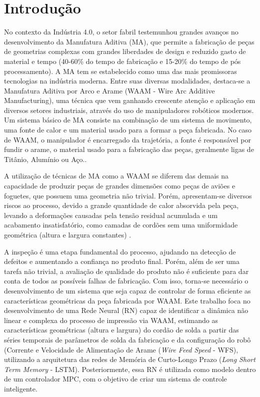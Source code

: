 \chapter{Introdução}
No contexto da Indústria 4.0, o setor fabril testemunhou grandes avanços no desenvolvimento da Manufatura Aditiva (MA), que permite a fabricação de peças de geometrias complexas com grandes liberdades de design e reduzido gasto de material e tempo (40-60\% do tempo de fabricação e 15-20\% do tempo de pós processamento). A MA tem se estabelecido como uma das mais promissoras tecnologias na indústria moderna. Entre suas diversas modalidades, destaca-se a Manufatura Aditiva por Arco e Arame (WAAM - Wire Arc Additive Manufacturing), uma técnica que vem ganhando crescente atenção e aplicação em diversos setores industriais, através do uso de manipuladores robóticos modernos. Um sistema básico de MA consiste na combinação de um sistema de movimento, uma fonte de calor e um material usado para a formar a peça fabricada. No caso de WAAM, o manipulador é encarregado da trajetória, a fonte é responsável por fundir o arame, o material usado para a fabricação das peças, geralmente ligas de Titânio, Alumínio ou Aço.\cite{williams2016wire, wu2018review}. 

A utilização de técnicas de MA como a WAAM se diferem das demais na capacidade de produzir peças de grandes dimensões como peças de aviões e foguetes, que possuem uma geometria não trivial. Porém, apresentam-se diversos riscos ao processo, devido a grande quantidade de calor absorvida pela peça, levando a deformações causadas pela tensão residual acumulada e um acabamento insatisfatório, como camadas de cordões sem uma uniformidade geométrica (altura e largura constantes) \cite{ding2015wire}.

A inspeção é uma etapa fundamental do processo, ajudando na detecção de defeitos e aumentando a confiança no produto final. Porém, além de ser uma tarefa não trivial, a avaliação de qualidade do produto não é suficiente para dar conta de todos as possíveis falhas de fabricação. Com isso, torna-se necessário o desenvolvimento de um sistema que seja capaz de controlar de forma eficiente as características geométricas da peça fabricada por WAAM. Este trabalho foca no desenvolvimento de uma Rede Neural (RN) capaz de identificar a dinâmica não linear e complexa do processo de impressão via WAAM, estimando as características geométricas (altura e largura) do cordão de solda a partir das séries temporais de parâmetros de solda da fabricação e da configuração do robô (Corrente e Velocidade de Alimentação de Arame (\textit{Wire Feed Speed} - WFS), utilizando a arquitetura das redes de Memória de Curto-Longo Prazo (\textit{Long Short Term Memory} - LSTM). Posteriormente, essa RN é utilizada como modelo dentro de um controlador MPC, com o objetivo de criar um sistema de controle inteligente.

